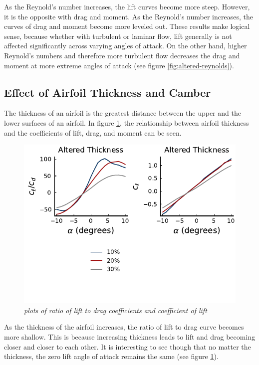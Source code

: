 \documentclass{journal}
\begin{document}
	As the Reynold's number increases, the lift curves become more steep. However, it is the opposite with drag and moment. As the Reynold's number increases, the curves of drag and moment become more leveled out. These results make logical sense, because whether with turbulent or laminar flow, lift generally is not affected significantly across varying angles of attack. On the other hand, higher Reynold's numbers and therefore more turbulent flow decreases the drag and moment at more extreme angles of attack (see figure \ref{fig:altered-reynolds}).
	
	\subsection{Effect of Airfoil Thickness and Camber}
	The thickness of an airfoil is the greatest distance between the upper and the lower surfaces of an airfoil. In figure \ref{fig:altered-thickness}, the relationship between airfoil thickness and the coefficients of lift, drag, and moment can be seen.
	
	\begin{figure}
		\centering
		\includegraphics{../graphics/altered-thickness.pdf}
		\caption{\emph{plots of ratio of lift to drag coefficients and coefficient of lift}}
		\label{fig:altered-thickness}
	\end{figure}
	
	As the thickness of the airfoil increases, the ratio of lift to drag curve becomes more shallow. This is because increasing thickness leads to lift and drag becoming closer and closer to each other. It is interesting to see though that no matter the thickness, the zero lift angle of attack remains the same (see figure \ref{fig:altered-thickness}).
	
\end{document}
